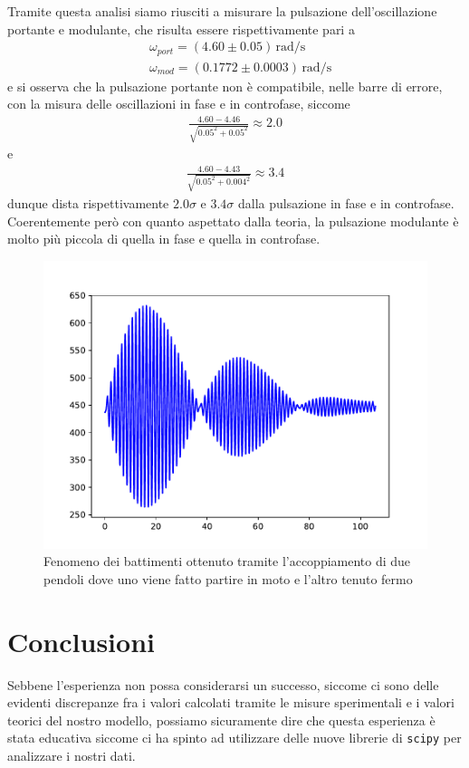 \documentclass{article}
\begin{document}
Tramite questa analisi siamo riusciti a misurare la pulsazione dell'oscillazione portante e modulante, che risulta essere rispettivamente pari a
\begin{align*}
&\omega_{port} = (4.60 \pm 0.05) \, \si{\radian\per\second} \\
&\omega_{mod} = (0.1772 \pm 0.0003) \, \si{\radian\per\second}
\end{align*}
e si osserva che la pulsazione portante non è compatibile, nelle barre di errore, con la misura delle oscillazioni in fase e in controfase, siccome
\begin{align*}
	\frac{4.60 - 4.46}{\sqrt{0.05^2 + 0.05^2}} \approx 2.0
\end{align*}
e
\begin{align*}
	\frac{4.60 - 4.43}{\sqrt{0.05^2 + 0.004^2}} \approx 3.4
\end{align*}
dunque dista rispettivamente $2.0\sigma$ e $3.4\sigma$ dalla pulsazione in fase e in controfase. Coerentemente però con quanto aspettato dalla teoria, la pulsazione modulante è molto più piccola di quella in fase e quella in controfase.
\begin{figure}[H]
	\centering
	\includegraphics[scale=0.50]{battimenti.pdf}
	\caption{Fenomeno dei battimenti ottenuto tramite l'accoppiamento di due pendoli dove uno viene fatto partire in moto e l'altro tenuto fermo}
\end{figure}
\section{Conclusioni}
Sebbene l'esperienza non possa considerarsi un successo, siccome ci sono delle evidenti discrepanze fra i valori calcolati tramite le misure sperimentali e i valori teorici del nostro modello, possiamo sicuramente dire che questa esperienza è stata educativa siccome ci ha spinto ad utilizzare delle nuove librerie di \texttt{scipy} per analizzare i nostri dati.
\end{document}
